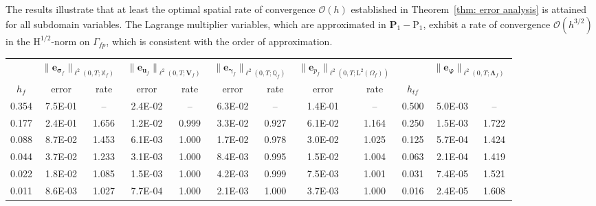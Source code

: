 \documentclass[11pt]{article}
\numberwithin{equation}{section}
\newcommand{\bgamma}{{\boldsymbol\gamma}}
\newcommand{\bLambda}{{\boldsymbol\Lambda}}
\newcommand{\bsi}{{\boldsymbol\sigma}}
\newcommand{\bvarphi}{{\boldsymbol\varphi}}
\newcommand{\bu}{\mathbf{u}}
\newcommand{\be}{{\mathbf{e}}}
\newcommand{\0}{{\mathbf{0}}}
\def\bV{\mathbf{V}}
\def\bP{\mathbf{P}}
\newcommand\bbQ{\mathbb{Q}}
\newcommand\bbX{\mathbb{X}}
\newcommand{\cO}{\mathcal{O}}
\def\H{\mathrm{H}}
\def\L{\mathrm{L}}
\def\rP{\mathrm{P}}
\numberwithin{equation}{section}
\begin{document}
The results illustrate that at least the optimal spatial rate of convergence $\cO(h)$ established in Theorem~\ref{thm: error analysis} is attained for all subdomain variables.
The Lagrange multiplier variables, which are approximated in $\bP_1-\rP_1$, exhibit a rate of convergence $\cO(h^{3/2})$ in the $\H^{1/2}$-norm on $\Gamma_{fp}$, which is consistent with the order of approximation.
\begin{table}[ht]
\begin{center}
\small{			
\begin{tabular}{|c||cc|cc|cc|cc||c||cc|}
\hline
& \multicolumn{2}{|c|}{$\|\be_{\bsi_{f}}\|_{\ell^2(0,T;\bbX_f)}$}  
& \multicolumn{2}{|c|}{$\|\be_{\bu_f}\|_{\ell^2(0,T;\bV_f)}$} 
& \multicolumn{2}{|c|}{$\|\be_{\bgamma_f}\|_{\ell^2(0,T;\bbQ_f)}$}  
& \multicolumn{2}{|c||}{$\|\be_{p_f}\|_{\ell^2(0,T;\L^2(\Omega_f))}$} 
&
& \multicolumn{2}{|c|}{$\|\be_{\bvarphi}\|_{\ell^2(0,T;\bLambda_f)}$} \\
$h_f$  & error & rate & error & rate & error & rate & error & rate & $h_{tf}$ & & \\  \hline
0.354 & 7.5E-01 &   --  & 2.4E-02 &   --  & 6.3E-02 &   --  & 1.4E-01 &   --  & 0.500 & 5.0E-03 &   -- \\ 
0.177 & 2.4E-01 & 1.656 & 1.2E-02 & 0.999 & 3.3E-02 & 0.927 & 6.1E-02 & 1.164 & 0.250 & 1.5E-03 & 1.722 \\
0.088 & 8.7E-02 & 1.453 & 6.1E-03 & 1.000 & 1.7E-02 & 0.978 & 3.0E-02 & 1.025 & 0.125 & 5.7E-04 & 1.424 \\
0.044 & 3.7E-02 & 1.233 & 3.1E-03 & 1.000 & 8.4E-03 & 0.995 & 1.5E-02 & 1.004 & 0.063 & 2.1E-04 & 1.419 \\
0.022 & 1.8E-02 & 1.085 & 1.5E-03 & 1.000 & 4.2E-03 & 0.999 & 7.5E-03 & 1.001 & 0.031 & 7.4E-05 & 1.521 \\
0.011 & 8.6E-03 & 1.027 & 7.7E-04 & 1.000 & 2.1E-03 & 1.000 & 3.7E-03 & 1.000 & 0.016 & 2.4E-05 & 1.608 \\
\hline 
\end{tabular}
		
\medskip

}
\end{center}
\end{table}
\end{document}
